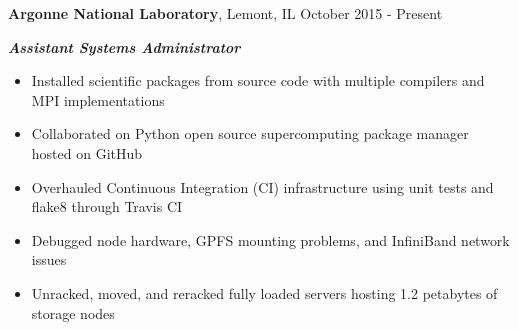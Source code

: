 
\textbf{Argonne National Laboratory}, Lemont, IL \hfill October 2015 - Present

\textbf{\textit{Assistant Systems Administrator}}

\begin{itemize}
    \item Installed scientific packages from source code with multiple compilers and MPI implementations
    \item Collaborated on Python open source supercomputing package manager hosted on GitHub
    \item Overhauled Continuous Integration (CI) infrastructure using unit tests and flake8 through Travis CI
    \item Debugged node hardware, GPFS mounting problems, and InfiniBand network issues
    \item Unracked, moved, and reracked fully loaded servers hosting 1.2 petabytes of storage nodes
\end{itemize}
